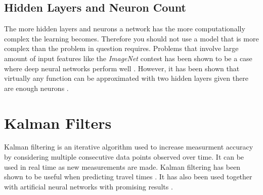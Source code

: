 \subsection{Hidden Layers and Neuron Count}
The more hidden layers and neurons a network has the more computationally complex the learning becomes. Therefore you should not use a model that is more complex than the problem in question requires. Problems that involve large amount of input features like the \textit{ImageNet} contest has been shown to be a case where deep neural networks perform well \cite{ImageNet}. However, it has been shown that virtually any function can be approximated with two hidden layers given there are enough neurons \cite{Demuth}.

\section{Kalman Filters}
Kalman filtering is an iterative algorithm used to increase measurment accuracy by considering multiple consecutive data points observed over time. It can be used in real time as new measurements are made. Kalman filtering has been shown to be useful when predicting travel times \cite{kalmanPrediction}. It has also been used together with artificial neural networks with promising results \cite{kalmanANN}.






